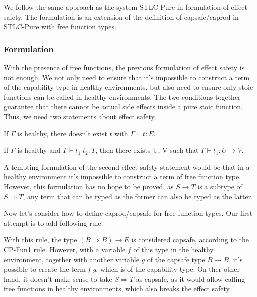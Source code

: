 We follow the same approach as the system STLC-Pure in formulation of
effect safety. The formulation is an extension of the definition of
capsafe/caprod in STLC-Pure with free function types.

\subsubsection{Formulation}

With the presence of free functions, the previous formulation of
effect safety is not enough. We not only need to ensure that it's
impossible to construct a term of the capability type in healthy
environments, but also need to ensure only stoic functions can be
called in healthy environments. The two conditions together guarantee
that there cannot be actual side effects inside a pure stoic
function. Thus, we need two statements about effect safety.

\begin{definition}
  If $\Gamma$ is healthy, there doesn't exist $t$ with
  $\Gamma \vdash t : E$.
\end{definition}

\begin{definition}
  If $\Gamma$ is healthy and $\Gamma \vdash t_1 \; t_2 : T$, then
  there exists U, V such that $\Gamma \vdash t_1 : U \to V$.
\end{definition}

A tempting formulation of the second effect safety statement would be
that in a healthy environment it's impossible to construct a term of
free function type. However, this formulation has no hope to be
proved, as $S \to T$ is a subtype of $S \Rightarrow T$, any term that
can be typed as the former can also be typed as the latter.

Now let's consider how to define caprod/capsafe for free function
types. Our first attempt is to add following rule:


With this rule, the type $(B \Rightarrow B) \to E$ is considered
capsafe, according to the CP-Fun1 rule. However, with a variable $f$
of this type in the healthy environment, together with another
variable $g$ of the capsafe type $B \to B$, it's possible to create
the term \emph{f g}, which is of the capability type. On ther other
hand, it doesn't make sense to take $S \Rightarrow T$ as capsafe, as
it would allow calling free functions in healthy environments,
which also breaks the effect safety.

